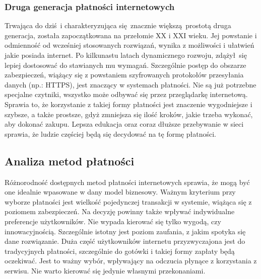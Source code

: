 \subsubsection*{Druga generacja płatności internetowych}

Trwająca do dziś i charakteryzująca się znacznie większą prostotą druga generacja, została zapoczątkowana na przełomie XX i XXI wieku. Jej powstanie i odmienność od wcześniej stosowanych rozwiązań, wynika z możliwości i ułatwień jakie posiada internet. Po kilkunastu latach dynamicznego rozwoju, zdążył się lepiej dostosować do stawianych mu wymagań. Szczególnie postęp do obszarze zabezpieczeń, wiążący się z powstaniem szyfrowanych protokołów przesyłania danych (np.: HTTPS), jest znaczący w systemach płatności. Nie są już potrzebne specjalne czytniki, wszystko może odbywać się przez przeglądarkę internetową. Sprawia to, że korzystanie z takiej formy płatności jest znaczenie wygodniejsze i szybsze, a także prostsze, gdyż zmniejsza się ilość kroków, jakie trzeba wykonać, aby dokonać zakupu. Lepsza edukacja oraz coraz dłuższe przebywanie w sieci sprawia, że ludzie częściej będą się decydować na tę formę płatności.  


\subsection{Analiza metod płatności}

Różnorodność dostępnych metod płatności internetowych sprawia, że mogą być one idealnie wpasowane w dany model biznesowy. Ważnym kryterium przy wyborze płatności jest wielkość pojedynczej transakcji w systemie, wiążąca się z poziomem zabezpieczeń. Na decyzję powinny także wpływać indywidualne preferencje użytkowników. Nie wypada kierować się tylko wygodą, czy innowacyjnością. Szczególnie istotny jest poziom zaufania, z jakim spotyka się dane rozwiązanie. Duża część użytkowników internetu przyzwyczajona jest do tradycyjnych płatności, szczególnie do gotówki i takiej formy zapłaty będą oczekiwać. Jest to ważny wybór, wpływający na odczucia płynące z korzystania z serwisu. Nie warto kierować się jedynie własnymi przekonaniami.

